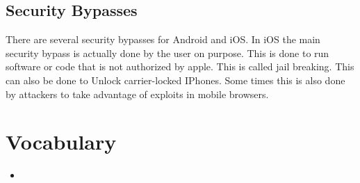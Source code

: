 \documentclass[letterpaper, onecolumn,10pt]{IEEEtran}
\begin{document}
		     \subsection{Security Bypasses}
		     There are several security bypasses for Android and iOS. In iOS the main security bypass is actually done by the user on purpose. This is done to run software or code that is not authorized by apple. This is called jail breaking. This can also be done to Unlock carrier-locked IPhones. Some times this is also done by attackers to take advantage of exploits in mobile browsers.\\
		    
	    \section{Vocabulary}
	        \begin{itemize}
	            \item 
	        \end{itemize}
			
		
\end{document}
